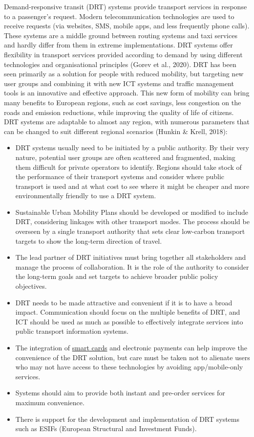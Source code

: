 \documentclass[
]{book}
\providecommand{\tightlist}{%
  \setlength{\itemsep}{0pt}\setlength{\parskip}{0pt}}
\begin{document}
Demand-responsive transit (DRT) systems provide transport services in response to a passenger's request. Modern telecommunication technologies are used to receive requests (via websites, SMS, mobile apps, and less frequently phone calls). These systems are a middle ground between routing systems and taxi services and hardly differ from them in extreme implementations. DRT systems offer flexibility in transport services provided according to demand by using different technologies and organisational principles (Gorev et al., 2020).
DRT has been seen primarily as a solution for people with reduced mobility, but targeting new user groups and combining it with new ICT systems and traffic management tools is an innovative and effective approach. This new form of mobility can bring many benefits to European regions, such as cost savings, less congestion on the roads and emission reductions, while improving the quality of life of citizens. DRT systems are adaptable to almost any region, with numerous parameters that can be changed to suit different regional scenarios (Hunkin \& Krell, 2018):

\begin{itemize}
\tightlist
\item
  DRT systems usually need to be initiated by a public authority. By their very nature, potential user groups are often scattered and fragmented, making them difficult for private operators to identify. Regions should take stock of the performance of their transport systems and consider where public transport is used and at what cost to see where it might be cheaper and more environmentally friendly to use a DRT system.
\item
  Sustainable Urban Mobility Plans should be developed or modified to include DRT, considering linkages with other transport modes. The process should be overseen by a single transport authority that sets clear low-carbon transport targets to show the long-term direction of travel.
\item
  The lead partner of DRT initiatives must bring together all stakeholders and manage the process of collaboration. It is the role of the authority to consider the long-term goals and set targets to achieve broader public policy objectives.
\item
  DRT needs to be made attractive and convenient if it is to have a broad impact. Communication should focus on the multiple benefits of DRT, and ICT should be used as much as possible to effectively integrate services into public transport information systems.
\item
  The integration of \protect\hyperlink{contactless_cards}{smart cards} and electronic payments can help improve the convenience of the DRT solution, but care must be taken not to alienate users who may not have access to these technologies by avoiding app/mobile-only services.
\item
  Systems should aim to provide both instant and pre-order services for maximum convenience.
\item
  There is support for the development and implementation of DRT systems such as ESIFs (European Structural and Investment Funds).
\end{itemize}
\end{document}
